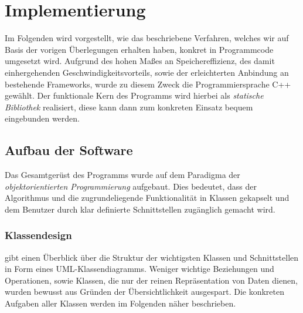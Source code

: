 \chapter{Implementierung}

Im Folgenden wird vorgestellt, wie das beschriebene Verfahren, welches wir auf Basis der vorigen
\"Uberlegungen erhalten haben, konkret in Programmcode umgesetzt wird. Aufgrund des hohen Ma{\ss}es an Speichereffizienz,
des damit einhergehenden Geschwindigkeitsvorteils, sowie der erleichterten Anbindung an bestehende Frameworks,
wurde zu diesem Zweck die Programmiersprache C++ gew\"ahlt. Der funktionale Kern des Programms wird hierbei als
\textit{statische Bibliothek} realisiert, diese kann dann zum konkreten Einsatz bequem eingebunden werden.

\section{Aufbau der Software}

Das Gesamtger\"ust des Programms wurde auf dem Paradigma der \textit{objektorientierten Programmierung} aufgebaut. Dies bedeutet,
dass der Algorithmus
und die zugrundeliegende Funktionalit\"at in Klassen gekapselt und dem Benutzer durch klar definierte Schnittstellen zug\"anglich
gemacht wird.

\subsection{Klassendesign}

 gibt einen \"Uberblick \"uber die Struktur der wichtigsten Klassen und Schnittstellen in Form eines
UML-Klassendiagramms.
Weniger wichtige Beziehungen und Operationen, sowie Klassen, die nur der reinen Repr\"asentation von Daten dienen, wurden bewusst
aus Gr\"unden der \"Ubersichtlichkeit ausgespart.
Die konkreten Aufgaben aller Klassen werden im Folgenden n\"aher beschrieben.

